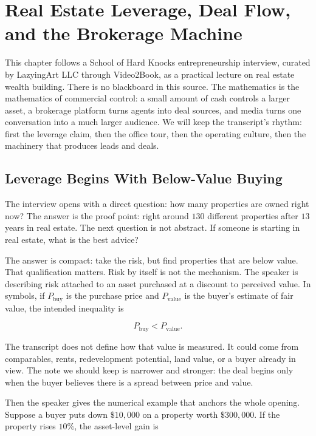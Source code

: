 \chapter{Real Estate Leverage, Deal Flow, and the Brokerage Machine}

This chapter follows a School of Hard Knocks entrepreneurship interview, curated by LazyingArt LLC through Video2Book, as a practical lecture on real estate wealth building. There is no blackboard in this source. The mathematics is the mathematics of commercial control: a small amount of cash controls a larger asset, a brokerage platform turns agents into deal sources, and media turns one conversation into a much larger audience. We will keep the transcript's rhythm: first the leverage claim, then the office tour, then the operating culture, then the machinery that produces leads and deals.

\section{Leverage Begins With Below-Value Buying}

The interview opens with a direct question: how many properties are owned right now? The answer is the proof point: right around \(130\) different properties after \(13\) years in real estate. The next question is not abstract. If someone is starting in real estate, what is the best advice?

The answer is compact: take the risk, but find properties that are below value. That qualification matters. Risk by itself is not the mechanism. The speaker is describing risk attached to an asset purchased at a discount to perceived value. In symbols, if \(P_{\mathrm{buy}}\) is the purchase price and \(P_{\mathrm{value}}\) is the buyer's estimate of fair value, the intended inequality is

\begin{equation}
P_{\mathrm{buy}} < P_{\mathrm{value}}.
\end{equation}

The transcript does not define how that value is measured. It could come from comparables, rents, redevelopment potential, land value, or a buyer already in view. The note we should keep is narrower and stronger: the deal begins only when the buyer believes there is a spread between price and value.

Then the speaker gives the numerical example that anchors the whole opening. Suppose a buyer puts down \(\$10{,}000\) on a property worth \(\$300{,}000\). If the property rises \(10\%\), the asset-level gain is

